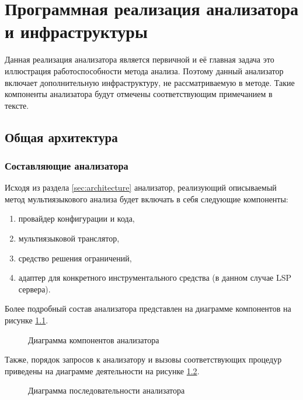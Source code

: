 \chapter{Программная реализация анализатора и инфраструктуры}

Данная реализация анализатора является первичной и её главная задача это иллюстрация работоспособности метода анализа.
Поэтому данный анализатор включает дополнительную инфраструктуру, не рассматриваемую в методе. Такие компоненты
анализатора будут отмечены соответствующим примечанием в тексте.

\section{Общая архитектура}

\subsection{Составляющие анализатора}

Исходя из раздела \ref{sec:architecture} анализатор, реализующий описываемый метод мультиязыкового анализа будет включать в себя следующие
компоненты:
\begin{enumerate}[1)]
    \item провайдер конфигурации и кода,
    \item мультиязыковой транслятор,
    \item средство решения ограничений,
    \item адаптер для конкретного инструментального средства (в данном случае LSP сервера).
\end{enumerate}

Более подробный состав анализатора представлен на диаграмме компонентов на рисунке \ref{fig:components}.

\begin{figure}[H]
    \centering
    \caption{Диаграмма компонентов анализатора}
    \label{fig:components}
\end{figure}

Также, порядок запросов к анализатору и вызовы соответствующих процедур приведены на диаграмме деятельности
на рисунке \ref{fig:sequence}.

\begin{figure}[H]
    \centering
    \caption{Диаграмма последовательности анализатора}
    \label{fig:sequence}
\end{figure}

